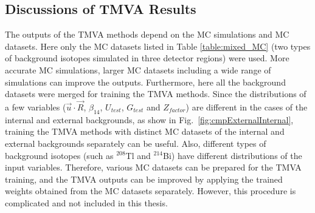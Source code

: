 	
%

\subsection{Discussions of TMVA Results}\label{sect:TMVAdiscussion}

The outputs of the TMVA methods depend on the MC simulations and MC datasets. Here only the MC datasets listed in Table \ref{table:mixed_MC} (two types of background isotopes simulated in three detector regions) were used. More accurate MC simulations, larger MC datasets including a wide range of simulations can improve the outputs. Furthermore, here all the background datasets were merged for training the TMVA methods. Since the distributions of a few variables ($\vec{u}\cdot\vec{R}$, $\beta_{14}$, $U_{test}$, $G_{test}$ and $Z_{factor}$) are different in the cases of the internal and external backgrounds, as show in Fig.~\ref{fig:cmpExternalInternal}, training the TMVA methods with distinct MC datasets of the internal and external backgrounds separately can be useful. Also, different types of background isotopes (such as $^{208}$Tl and $^{214}$Bi) have different distributions of the input variables. Therefore, various MC datasets can be prepared for the TMVA training, and the TMVA outputs can be improved by applying the trained weights obtained from the MC datasets separately. However, this procedure is complicated and not included in this thesis. 

